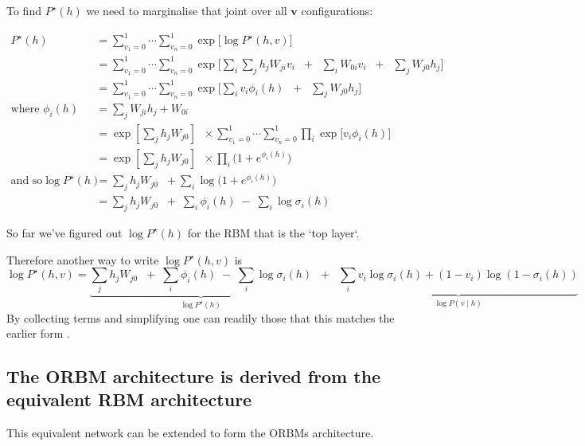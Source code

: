
To find $P^\star(h)$ we need to marginalise that joint over all $\mathbf{v}$ configurations:

$$
 \begin{aligned}
P^\star(h) &= \sum_{v_1=0}^1 \cdots \sum_{v_n=0}^1 \exp \bigg[  \log P^{\star}(h,v) \bigg] \\
&= \sum_{v_1=0}^1 \cdots \sum_{v_n=0}^1 \exp \bigg[  \sum_i  \sum_j h_j W_{ji} v_i \;\; + \;\; \sum_i W_{0i} v_i \;\; + \;\; \sum_j W_{j0} h_j \bigg] \\
&= \sum_{v_1=0}^1 \cdots \sum_{v_n=0}^1 \exp \bigg[  \sum_i v_i \phi_i(h)  \;\; + \;\; \sum_j W_{j0} h_j \bigg] \\
\text{where } \phi_i(h) &= \sum_j W_{ji} h_j + W_{0i} \\
&= \exp\left[ \sum_j h_j  W_{j0} \right] \;\; \times \sum_{v_1=0}^1 \cdots \sum_{v_n=0}^1 \prod_i \exp\bigg[ v_i \phi_i(h) \bigg] \\
&= \exp\left[\sum_j h_j  W_{j0}\right] \;\; \times \prod_i \bigg( 1 + e^{\phi_i(h) } \bigg) \\
\text{and so}
\log P^\star(h) &= \sum_j h_j  W_{j0} \;\; +  \sum_i \log \bigg( 1 + e^{\phi_i(h) } \bigg)
\\
&= \sum_j h_j  W_{j0} \;\; + \; \sum_i \phi_i(h) \;  - \; \sum_i \log \sigma_i(h)
\end{aligned}
$$

So far we've figured out $\log P^\star(h)$ for the RBM that is the `top layer`.

Therefore another way to write $\log P^\star(h,v)$ is
$$
\log P^\star(h,v) = \underbrace{\sum_j h_j  W_{j0} \;\; + \; \sum_i \phi_i(h) \;  - \; \sum_i \log \sigma_i(h)}_{\log P^\star(h)} \;\;+\;\; \underbrace{\sum_i v_i \log \sigma_i(h) + (1-v_i) \log (1 - \sigma_i(h))}_{\log P(v \mid h)}
$$
By collecting terms and simplifying one can readily those that this matches the earlier form .


\subsection{The ORBM architecture is derived from the equivalent RBM architecture}
This equivalent network can be extended to form the ORBMs architecture.

